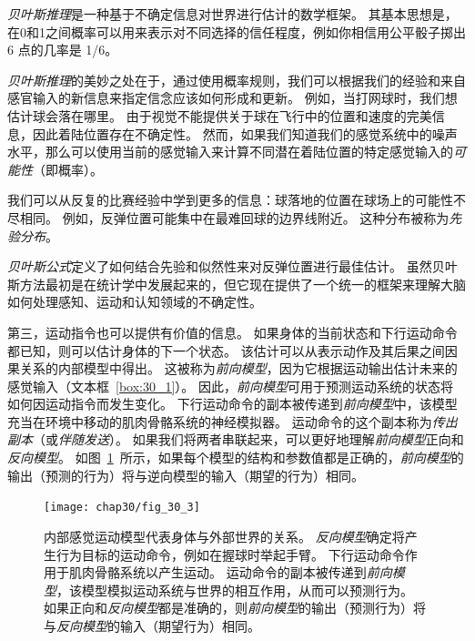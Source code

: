 \begin{proposition}[贝叶斯推理] \label{box:30_2}
	
	\quad \quad \textit{贝叶斯推理}是一种基于不确定信息对世界进行估计的数学框架。
	其基本思想是，在0和1之间概率可以用来表示对不同选择的信任程度，例如你相信用公平骰子掷出 6 点的几率是 1/6。
	
	\quad \quad \textit{贝叶斯推理}的美妙之处在于，通过使用概率规则，我们可以根据我们的经验和来自感官输入的新信息来指定信念应该如何形成和更新。
	例如，当打网球时，我们想估计球会落在哪里。
	由于视觉不能提供关于球在飞行中的位置和速度的完美信息，因此着陆位置存在不确定性。
	然而，如果我们知道我们的感觉系统中的噪声水平，那么可以使用当前的感觉输入来计算不同潜在着陆位置的特定感觉输入的\textit{可能性}（即概率）。
	
	\quad \quad 我们可以从反复的比赛经验中学到更多的信息：球落地的位置在球场上的可能性不尽相同。
	例如，反弹位置可能集中在最难回球的边界线附近。
	这种分布被称为\textit{先验分布}。
	
	\quad \quad \textit{贝叶斯公式}定义了如何结合先验和似然性来对反弹位置进行最佳估计。
	虽然贝叶斯方法最初是在统计学中发展起来的，但它现在提供了一个统一的框架来理解大脑如何处理感知、运动和认知领域的不确定性。
	
\end{proposition}


第三，运动指令也可以提供有价值的信息。
如果身体的当前状态和下行运动命令都已知，则可以估计身体的下一个状态。
该估计可以从表示动作及其后果之间因果关系的内部模型中得出。
这被称为\textit{前向模型}，因为它根据运动输出估计未来的感觉输入（文本框~\ref{box:30_1}）。
因此，\textit{前向模型}可用于预测运动系统的状态将如何因运动指令而发生变化。
下行运动命令的副本被传递到\textit{前向模型}中，该模型充当在环境中移动的肌肉骨骼系统的神经模拟器。
运动命令的这个副本称为\textit{传出副本}（或\textit{伴随发送}）。
如果我们将两者串联起来，可以更好地理解\textit{前向模型}正向和\textit{反向模型}。
如图~\ref{fig:30_3}~所示，如果每个模型的结构和参数值都是正确的，\textit{前向模型}的输出（预测的行为）将与逆向模型的输入（期望的行为）相同。


\begin{figure}[htbp]
	\centering
	\texttt{[image: chap30/fig\_30\_3]}
	\caption{内部感觉运动模型代表身体与外部世界的关系。
		\textit{反向模型}确定将产生行为目标的运动命令，例如在握球时举起手臂。
		下行运动命令作用于肌肉骨骼系统以产生运动。
		运动命令的副本被传递到\textit{前向模型}，该模型模拟运动系统与世界的相互作用，从而可以预测行为。
		如果正向和\textit{反向模型}都是准确的，则\textit{前向模型}的输出（预测行为）将与\textit{反向模型}的输入（期望行为）相同。}
	\label{fig:30_3}
\end{figure}


